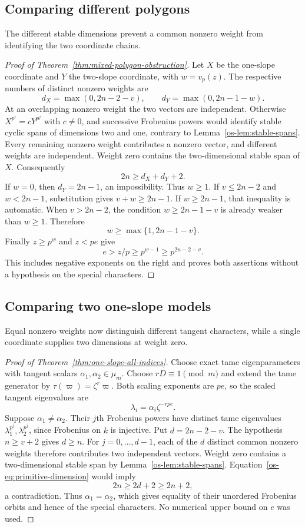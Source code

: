 \subsection{Comparing different polygons}
The different stable dimensions prevent a common nonzero weight from identifying the two coordinate chains.

\begin{proof}[Proof of Theorem~\ref{thm:mixed-polygon-obstruction}]
Let $X$ be the one-slope coordinate and $Y$ the two-slope coordinate, with $w=v_p(z)$. The respective numbers of distinct nonzero weights are
\[
 d_X=\max(0,2n-2-v),\qquad
 d_Y=\max(0,2n-1-w).
\]
At an overlapping nonzero weight the two vectors are independent. Otherwise $X^{p^i}=cY^{p^j}$ with $c\ne0$, and successive Frobenius powers would identify stable cyclic spans of dimensions two and one, contrary to Lemma~\ref{os-lem:stable-spans}. Every remaining nonzero weight contributes a nonzero vector, and different weights are independent. Weight zero contains the two-dimensional stable span of $X$. Consequently
\begin{equation}\label{os-eq:dimension-inequality}
 2n\ge d_X+d_Y+2.
\end{equation}
If $w=0$, then $d_Y=2n-1$, an impossibility. Thus $w\ge1$. If $v\le2n-2$ and $w<2n-1$, substitution gives $v+w\ge2n-1$. If $w\ge2n-1$, that inequality is automatic. When $v>2n-2$, the condition $w\ge2n-1-v$ is already weaker than $w\ge1$. Therefore
\[
 w\ge\max\{1,2n-1-v\}.
\]
Finally $z\ge p^w$ and $z<pe$ give
\[
 e>z/p\ge p^{w-1}\ge p^{2n-2-v}.
\]
This includes negative exponents on the right and proves both assertions without a hypothesis on the special characters.
\end{proof}

\subsection{Comparing two one-slope models}
Equal nonzero weights now distinguish different tangent characters, while a single coordinate supplies two dimensions at weight zero.

\begin{proof}[Proof of Theorem~\ref{thm:one-slope-all-indices}]
Choose exact tame eigenparameters with tangent scalars $\alpha_1,\alpha_2\in\mu_m$. Choose $rD\equiv1\pmod m$ and extend the tame generator by $\tau(\varpi)=\zeta^r\varpi$. Both scaling exponents are $pe$, so the scaled tangent eigenvalues are
\[
 \lambda_i=\alpha_i\zeta^{-rpe}.
\]
Suppose $\alpha_1\ne\alpha_2$. Their $j$th Frobenius powers have distinct tame eigenvalues $\lambda_1^{p^j},\lambda_2^{p^j}$, since Frobenius on $k$ is injective. Put $d=2n-2-v$. The hypothesis $n\ge v+2$ gives $d\ge n$. For $j=0,\ldots,d-1$, each of the $d$ distinct common nonzero weights therefore contributes two independent vectors. Weight zero contains a two-dimensional stable span by Lemma~\ref{os-lem:stable-spans}. Equation~\eqref{os-eq:primitive-dimension} would imply
\[
 2n\ge2d+2\ge2n+2,
\]
a contradiction. Thus $\alpha_1=\alpha_2$, which gives equality of their unordered Frobenius orbits and hence of the special characters. No numerical upper bound on $e$ was used.
\end{proof}

